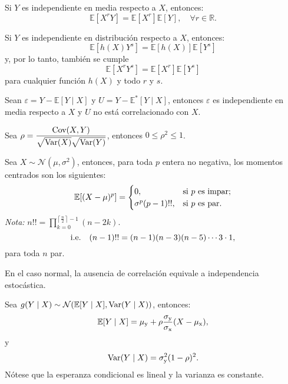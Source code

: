 \documentclass[8pt,a4paper]{extarticle}
\begin{document}
\begin{multicols}{3}
	\begin{boxprop}[]
		Si $Y$ es independiente en media respecto a $X$, entonces:
		\[
			\mathbb{E}[X^r Y] = \mathbb{E}[X^r] \mathbb{E}[Y], \quad \forall r\in \mathbb{R}
			.\]
	\end{boxprop}

	\begin{boxprop}[]
		Si $Y$ es independiente en distribución respecto a $X$, entonces:
		\[
			\mathbb{E}[h(X) Y^s] = \mathbb{E}[h(X)] \mathbb{E}[Y^s]
		\]
		y, por lo tanto, también se cumple
		\[
			\mathbb{E}[X^r Y^s] = \mathbb{E}[X^r] \mathbb{E}[Y^s]
		\]
		para cualquier función $h(X)$ y todo $r$ y $s$.
	\end{boxprop}

	\begin{boxprop}
		Sean $\varepsilon = Y - \mathbb{E} [Y \mid X]$ y $U = Y - \mathbb{E}^* [Y \mid X]$, entonces $\varepsilon$ es independiente en media respecto a $X$ y $U$ no está correlacionado con $X$.
	\end{boxprop}

	\newpage

	\begin{boxtheo}
		Sea $\displaystyle \rho = \frac{\text{\normalfont Cov}(X,Y)}{\sqrt{\text{\normalfont Var}(X)} \sqrt{\text{\normalfont Var}(Y)}}$, entonces $0 \leq \rho^{2} \leq 1$.
	\end{boxtheo}

	\begin{boxprop}
		Sea $X \sim \mathcal{N} (\mu,\sigma^{2})$, entonces, para toda $p$ entera no negativa, los momentos centrados son los siguientes:
		\[\mathbb{E} [(X - \mu)^{p}] =
		\begin{cases}
			0, & \text{si $p$ es impar}; \\
			\sigma^{p}(p-1)!!, & \text{si $p$ es par.}
		\end{cases} \]
		\emph{Nota:} $\displaystyle n!! = \prod_{k = 0}^{\left\lceil \frac{n}{2} \right\rceil - 1} (n - 2k)$. \[\text{\normalfont i.e.} \quad (n -1)!! = (n -1)(n - 3)(n - 5) \cdots 3 \cdot 1,\] para toda $n$ par.
	\end{boxprop}

	\begin{boxprop}
		En el caso normal, la ausencia de correlación equivale a independencia estocástica.
	\end{boxprop}

	\begin{boxprop}
		Sea $g(Y \mid X) \sim \mathcal{N}(\mathbb{E}[Y \mid X], \text{\normalfont Var}(Y \mid X))$, entonces:
		\[\mathbb{E} [Y \mid X] = \mu_{\mathrm{y}} + \rho \frac{\sigma_{\mathrm{y}}}{\sigma_{\mathrm{x}}} (X - \mu_{\mathrm{x}}),\]
		y
		\[\text{\normalfont Var}(Y \mid X) = \sigma_{\mathrm{y}}^{2} (1 - \rho)^2.\]
		Nótese que la esperanza condicional es lineal y la varianza es constante.
	\end{boxprop}


\end{multicols}
\end{document}

